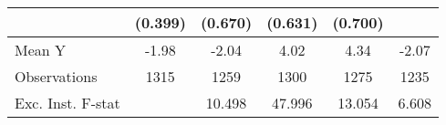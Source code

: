 {\begin{tabular}{l*{5}{c}}
            &     (0.399)         &     (0.670)         &     (0.631)         &     (0.700)         &                     \\
\midrule
Mean Y      &       -1.98         &       -2.04         &        4.02         &        4.34         &       -2.07         \\
Observations&        1315         &        1259         &        1300         &        1275         &        1235         \\
Exc. Inst. F-stat&                     &      10.498         &      47.996         &      13.054         &       6.608         \\
\bottomrule
\end{tabular}
}
